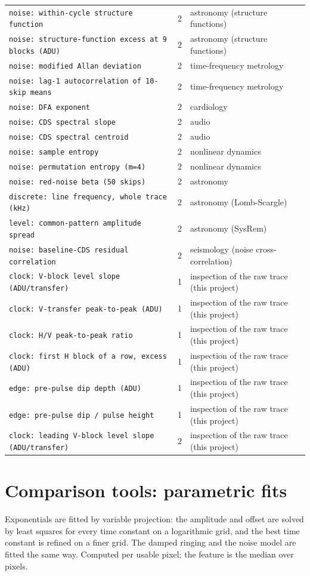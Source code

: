 \documentclass[10pt]{article}
\renewcommand{\_}{\oldunderscore\allowbreak}
\begin{document}
\begin{longtable}{>{\raggedright\arraybackslash}p{}c>{\raggedright\arraybackslash}p{}}
\texttt{noise: within-cycle structure function} & 2 & astronomy (structure functions) \\
\texttt{noise: structure-function excess at 9 blocks (ADU)} & 2 & astronomy (structure functions) \\
\texttt{noise: modified Allan deviation} & 2 & time-frequency metrology \\
\texttt{noise: lag-1 autocorrelation of 10-skip means} & 2 & time-frequency metrology \\
\texttt{noise: DFA exponent} & 2 & cardiology \\
\texttt{noise: CDS spectral slope} & 2 & audio \\
\texttt{noise: CDS spectral centroid} & 2 & audio \\
\texttt{noise: sample entropy} & 2 & nonlinear dynamics \\
\texttt{noise: permutation entropy (m=4)} & 2 & nonlinear dynamics \\
\texttt{noise: red-noise beta (50 skips)} & 2 & astronomy \\
\texttt{discrete: line frequency, whole trace (kHz)} & 2 & astronomy (Lomb-Scargle) \\
\texttt{level: common-pattern amplitude spread} & 2 & astronomy (SysRem) \\
\texttt{noise: baseline-CDS residual correlation} & 2 & seismology (noise cross-correlation) \\
\texttt{clock: V-block level slope (ADU/transfer)} & 1 & inspection of the raw trace (this project) \\
\texttt{clock: V-transfer peak-to-peak (ADU)} & 1 & inspection of the raw trace (this project) \\
\texttt{clock: H/V peak-to-peak ratio} & 1 & inspection of the raw trace (this project) \\
\texttt{clock: first H block of a row, excess (ADU)} & 1 & inspection of the raw trace (this project) \\
\texttt{edge: pre-pulse dip depth (ADU)} & 1 & inspection of the raw trace (this project) \\
\texttt{edge: pre-pulse dip / pulse height} & 1 & inspection of the raw trace (this project) \\
\texttt{clock: leading V-block level slope (ADU/transfer)} & 2 & inspection of the raw trace (this project) \\
\end{longtable}

\section{Comparison tools: parametric fits}
Exponentials are fitted by variable projection: the amplitude and offset are solved by least squares for every time constant on a logarithmic grid, and the best time constant is refined on a finer grid. The damped ringing and the noise model are fitted the same way. Computed per usable pixel; the feature is the median over pixels.
\end{document}
